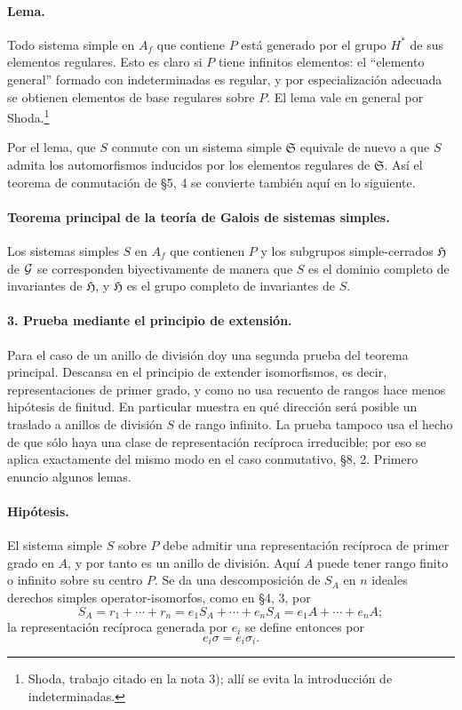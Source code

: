 \paragraph{Lema.}
Todo sistema simple en \(A_f\) que contiene \(P\) está generado por el grupo \(H^*\) de sus elementos regulares. Esto es claro si \(P\) tiene infinitos elementos: el “elemento general” formado con indeterminadas es regular, y por especialización adecuada se obtienen elementos de base regulares sobre \(P\). El lema vale en general por Shoda.\footnote{Shoda, trabajo citado en la nota 3); allí se evita la introducción de indeterminadas.}

Por el lema, que \(S\) conmute con un sistema simple \(\mathfrak S\) equivale de nuevo a que \(S\) admita los automorfismos inducidos por los elementos regulares de \(\mathfrak S\). Así el teorema de conmutación de §5, 4 se convierte también aquí en lo siguiente.

\paragraph{Teorema principal de la teoría de Galois de sistemas simples.}
Los sistemas simples \(S\) en \(A_f\) que contienen \(P\) y los subgrupos simple-cerrados \(\mathfrak H\) de \(\mathcal G\) se corresponden biyectivamente de manera que \(S\) es el dominio completo de invariantes de \(\mathfrak H\), y \(\mathfrak H\) es el grupo completo de invariantes de \(S\).

\paragraph{3. Prueba mediante el principio de extensión.}
Para el caso de un anillo de división doy una segunda prueba del teorema principal. Descansa en el principio de extender isomorfismos, es decir, representaciones de primer grado, y como no usa recuento de rangos hace menos hipótesis de finitud. En particular muestra en qué dirección será posible un traslado a anillos de división \(S\) de rango infinito. La prueba tampoco usa el hecho de que sólo haya una clase de representación recíproca irreducible; por eso se aplica exactamente del mismo modo en el caso conmutativo, §8, 2. Primero enuncio algunos lemas.

\paragraph{Hipótesis.}
El sistema simple \(S\) sobre \(P\) debe admitir una representación recíproca de primer grado en \(A\), y por tanto es un anillo de división. Aquí \(A\) puede tener rango finito o infinito sobre su centro \(P\). Se da una descomposición de \(S_A\) en \(n\) ideales derechos simples operator-isomorfos, como en §4, 3, por
\[
        S_A=r_1+\cdots+r_n
            =e_1S_A+\cdots+e_nS_A
            =e_1A+\cdots+e_nA ;
\]
la representación recíproca generada por \(e_i\) se define entonces por
\[
        e_i\sigma=e_i\sigma_i .
\]

